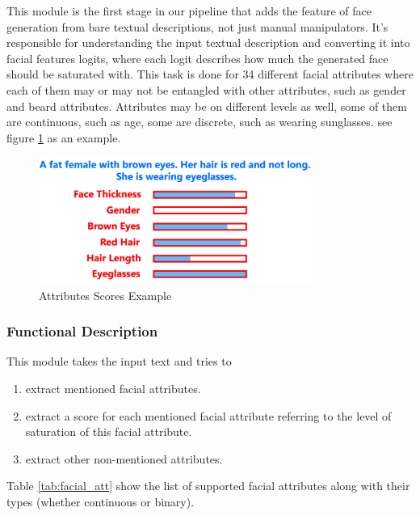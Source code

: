 This module is the first stage in our pipeline that adds the feature of face generation from bare textual descriptions, not just manual manipulators. It's responsible for understanding the input textual description and converting it into facial features logits, where each logit describes how much the generated face should be saturated with. This task is done for 34 different facial attributes where each of them may or may not be entangled with other attributes, such as gender and beard attributes. Attributes may be on different levels as well, some of them are continuous, such as age, some are discrete, such as wearing sunglasses. see figure \ref{fig:scores_example} as an example. 

\begin{figure}[H]
        \centering
        \includegraphics[width=0.8\textwidth]{images/scores-example.png}
        \caption{Attributes Scores Example}
        \label{fig:scores_example}
    \end{figure}


\subsubsection{Functional Description}
This module takes the input text and tries to 
\begin{enumerate}
    \item extract mentioned facial attributes.
    \item extract a score for each mentioned facial attribute referring to the level of saturation of this facial attribute.
    \item extract other non-mentioned attributes.
\end{enumerate}

Table \ref{tab:facial_att} show the list of supported facial attributes along with their types (whether continuous or binary).

